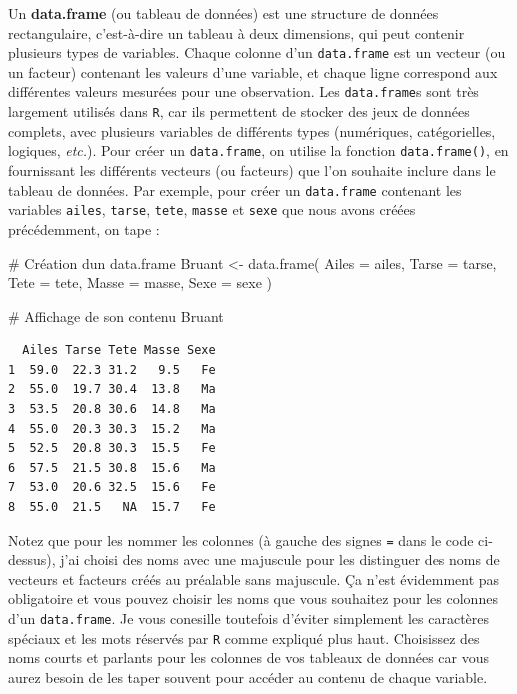 \documentclass[
  a4paper,
  DIV=11,
  numbers=noendperiod,
  oneside]{scrreprt}
\newenvironment{Shaded}{}{}
\newcommand{\AttributeTok}[1]{\textcolor[rgb]{0.84,0.23,0.29}{#1}}
\newcommand{\CommentTok}[1]{\textcolor[rgb]{0.42,0.45,0.49}{#1}}
\newcommand{\FunctionTok}[1]{\textcolor[rgb]{0.44,0.26,0.76}{#1}}
\newcommand{\NormalTok}[1]{\textcolor[rgb]{0.14,0.16,0.18}{#1}}
\newcommand{\OtherTok}[1]{\textcolor[rgb]{0.44,0.26,0.76}{#1}}
\begin{document}
Un \textbf{data.frame} (ou tableau de données) est une structure de
données rectangulaire, c'est-à-dire un tableau à deux dimensions, qui
peut contenir plusieurs types de variables. Chaque colonne d'un
\texttt{data.frame} est un vecteur (ou un facteur) contenant les valeurs
d'une variable, et chaque ligne correspond aux différentes valeurs
mesurées pour une observation. Les \texttt{data.frame}s sont très
largement utilisés dans \texttt{R}, car ils permettent de stocker des
jeux de données complets, avec plusieurs variables de différents types
(numériques, catégorielles, logiques, \emph{etc.}). Pour créer un
\texttt{data.frame}, on utilise la fonction \texttt{data.frame()}, en
fournissant les différents vecteurs (ou facteurs) que l'on souhaite
inclure dans le tableau de données. Par exemple, pour créer un
\texttt{data.frame} contenant les variables \texttt{ailes},
\texttt{tarse}, \texttt{tete}, \texttt{masse} et \texttt{sexe} que nous
avons créées précédemment, on tape :

\begin{Shaded}
\begin{Highlighting}[]
\CommentTok{\# Création d\textquotesingle{}un data.frame}
\NormalTok{Bruant }\OtherTok{\textless{}{-}} \FunctionTok{data.frame}\NormalTok{(}
  \AttributeTok{Ailes =}\NormalTok{ ailes,}
  \AttributeTok{Tarse =}\NormalTok{ tarse,}
  \AttributeTok{Tete =}\NormalTok{ tete,}
  \AttributeTok{Masse =}\NormalTok{ masse,}
  \AttributeTok{Sexe =}\NormalTok{ sexe}
\NormalTok{)}

\CommentTok{\# Affichage de son contenu}
\NormalTok{Bruant}
\end{Highlighting}
\end{Shaded}

\begin{verbatim}
  Ailes Tarse Tete Masse Sexe
1  59.0  22.3 31.2   9.5   Fe
2  55.0  19.7 30.4  13.8   Ma
3  53.5  20.8 30.6  14.8   Ma
4  55.0  20.3 30.3  15.2   Ma
5  52.5  20.8 30.3  15.5   Fe
6  57.5  21.5 30.8  15.6   Ma
7  53.0  20.6 32.5  15.6   Fe
8  55.0  21.5   NA  15.7   Fe
\end{verbatim}

Notez que pour les nommer les colonnes (à gauche des signes \texttt{=}
dans le code ci-dessus), j'ai choisi des noms avec une majuscule pour
les distinguer des noms de vecteurs et facteurs créés au préalable sans
majuscule. Ça n'est évidemment pas obligatoire et vous pouvez choisir
les noms que vous souhaitez pour les colonnes d'un \texttt{data.frame}.
Je vous conesille toutefois d'éviter simplement les caractères spéciaux
et les mots réservés par \texttt{R} comme expliqué plus haut. Choisissez
des noms courts et parlants pour les colonnes de vos tableaux de données
car vous aurez besoin de les taper souvent pour accéder au contenu de
chaque variable.
\end{document}
